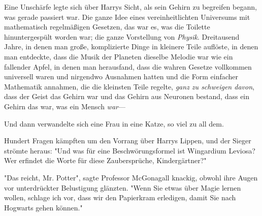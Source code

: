 Eine Unschärfe legte sich über Harrys Sicht, als sein Gehirn zu begreifen begann, was gerade passiert war. Die ganze Idee eines vereinheitlichten Universums mit mathematisch regelmäßigen Gesetzen, das war es, was die Toilette hinuntergespült worden war; die ganze Vorstellung von \emph{Physik}. Dreitausend Jahre, in denen man große, komplizierte Dinge in kleinere Teile auflöste, in denen man entdeckte, dass die Musik der Planeten dieselbe Melodie war wie ein fallender Apfel, in denen man herausfand, dass die wahren Gesetze vollkommen universell waren und nirgendwo Ausnahmen hatten und die Form einfacher Mathematik annahmen, die die kleinsten Teile regelte, \emph{ganz zu schweigen davon}, dass der Geist das Gehirn war und das Gehirn aus Neuronen bestand, dass ein Gehirn das war, was ein Mensch \emph{war}—

Und dann verwandelte sich eine Frau in eine Katze, so viel zu all dem.

Hundert Fragen kämpften um den Vorrang über Harrys Lippen, und der Sieger strömte heraus: "Und was für eine Beschwörungsformel ist Wingardium Leviosa? Wer erfindet die Worte für diese Zaubersprüche, Kindergärtner?"

"Das reicht, Mr. Potter", sagte Professor McGonagall knackig, obwohl ihre Augen vor unterdrückter Belustigung glänzten. "Wenn Sie etwas über Magie lernen wollen, schlage ich vor, dass wir den Papierkram erledigen, damit Sie nach Hogwarts gehen können."


